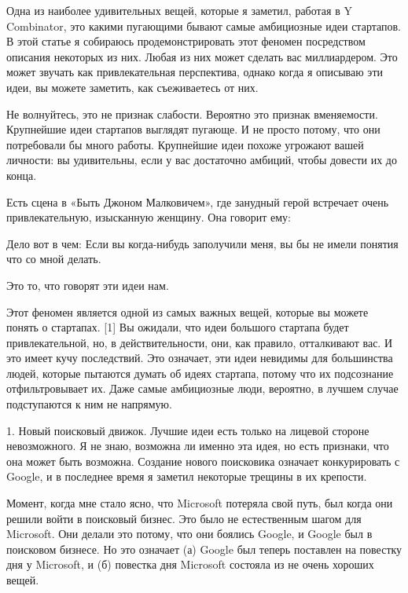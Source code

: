 \documentclass[ebook,12pt,oneside,openany]{memoir}
\author{Пол Грэм} \date{}
\begin{document}
\maketitle

Одна из наиболее удивительных вещей, которые я заметил, работая в Y
Combinator, это какими пугающими бывают самые амбициозные идеи
стартапов. В этой статье я собираюсь продемонстрировать этот феномен
посредством описания некоторых из них. Любая из них может сделать вас
миллиардером. Это может звучать как привлекательная перспектива,
однако когда я описываю эти идеи, вы можете заметить, как съеживаетесь
от них.

Не волнуйтесь, это не признак слабости. Вероятно это признак
вменяемости. Крупнейшие идеи стартапов выглядят пугающе. И не просто
потому, что они потребовали бы много работы. Крупнейшие идеи похоже
угрожают вашей личности: вы удивительны, если у вас достаточно
амбиций, чтобы довести их до конца.

Есть сцена в «Быть Джоном Малковичем», где занудный герой встречает
очень привлекательную, изысканную женщину. Она говорит ему:

Дело вот в чем: Если вы когда-нибудь заполучили меня, вы бы не имели
понятия что со мной делать.

Это то, что говорят эти идеи нам.

Этот феномен является одной из самых важных вещей, которые вы можете
понять о стартапах. [1] Вы ожидали, что идеи большого стартапа будет
привлекательной, но, в действительности, они, как правило, отталкивают
вас. И это имеет кучу последствий. Это означает, эти идеи невидимы для
большинства людей, которые пытаются думать об идеях стартапа, потому
что их подсознание отфильтровывает их. Даже самые амбициозные люди,
вероятно, в лучшем случае подступаются к ним не напрямую.

1. Новый поисковый движок. Лучшие идеи есть только на лицевой стороне
невозможного. Я не знаю, возможна ли именно эта идея, но есть
признаки, что она может быть возможна. Создание нового поисковика
означает конкурировать с Google, и в последнее время я заметил
некоторые трещины в их крепости.

Момент, когда мне стало ясно, что Microsoft потеряла свой путь, был
когда они решили войти в поисковый бизнес. Это было не естественным
шагом для Microsoft. Они делали это потому, что они боялись Google, и
Google был в поисковом бизнесе. Но это означает (а) Google был теперь
поставлен на повестку дня у Microsoft, и (б) повестка дня Microsoft
состояла из не очень хороших вещей.
\end{document}
